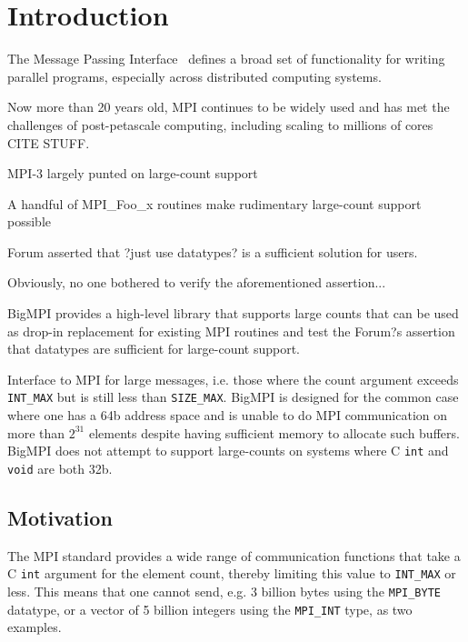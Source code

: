 
\section{Introduction}

The Message Passing Interface~\cite{mpiforum:94, mpiforum:96, mpiforum:09, mpiforum:12} 
defines a broad set of functionality for writing parallel programs, especially across
distributed computing systems.

Now more than 20 years old, MPI continues to be widely used and has met the challenges of
post-petascale computing, including scaling to millions of cores CITE STUFF.



MPI-3 largely punted on large-count support

A handful of MPI\_Foo\_x routines make rudimentary large-count support possible

Forum asserted that ?just use datatypes? is a sufficient solution for users.

Obviously, no one bothered to verify the aforementioned assertion...

BigMPI provides a high-level library that supports large counts that can be used as 
drop-in replacement for existing MPI routines and test the Forum?s assertion 
that datatypes are sufficient for large-count support.



Interface to MPI for large messages, i.e. those where the count argument
exceeds \texttt{INT\_MAX} but is still less than \texttt{SIZE\_MAX}.
BigMPI is designed for the common case where one has a 64b address
space and is unable to do MPI communication on more than $2^{31}$ elements
despite having sufficient memory to allocate such buffers.
BigMPI does not attempt to support large-counts on systems where
C \texttt{int} and \texttt{void\*} are both 32b.

\subsection{Motivation}

The MPI standard provides a wide range of communication functions that
take a C \texttt{int} argument for the element count, thereby limiting this
value to \texttt{INT\_MAX} or less.
This means that one cannot send, e.g. 3 billion bytes using the \texttt{MPI\_BYTE} 
datatype, or a vector of 5 billion integers using the \texttt{MPI\_INT} type, as
two examples.

